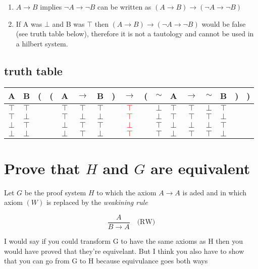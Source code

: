\documentclass{article}
\begin{document}
\begin{enumerate}
	\item $A \to B$ implies $\neg A \to \neg B$ can be written as 
		$(A \to B) \to (\neg A \to \neg B)$
	\item If A was $\bot$ and B was $\top$ then $(A \to B) \to (\neg A \to 
		\neg B)$ would be false (see truth table below), therefore it is not a tautology and cannot
		be used in a hilbert system.
\end{enumerate}
\subsection{truth table}
\begin{tabular}{@{ }c@{ }@{ }c | c@{}@{}c@{}@{ }c@{ }@{ }c@{ }@{ }c@{ }@{}c@{}@{ }c@{ }@{}c@{}@{ }c@{ }@{ }c@{ }@{ }c@{ }@{ }c@{ }@{ }c@{ }@{}c@{}@{}c@{ }}
A & B & ( & ( & A & $\rightarrow$ & B & ) & $\rightarrow$ & ( & $\sim$ & A & $\rightarrow$ & $\sim$ & B & ) & )\\
\hline 
$\top$ & $\top$ &  &  & $\top$ & $\top$ & $\top$ &  & \textcolor{red}{$\top$} &  & $\bot$ & $\top$ & $\top$ & $\bot$ & $\top$ &  & \\
$\top$ & $\bot$ &  &  & $\top$ & $\bot$ & $\bot$ &  & \textcolor{red}{$\top$} &  & $\bot$ & $\top$ & $\top$ & $\top$ & $\bot$ &  & \\
$\bot$ & $\top$ &  &  & $\bot$ & $\top$ & $\top$ &  & \textcolor{red}{$\bot$} &  & $\top$ & $\bot$ & $\bot$ & $\bot$ & $\top$ &  & \\
$\bot$ & $\bot$ &  &  & $\bot$ & $\top$ & $\bot$ &  & \textcolor{red}{$\top$} &  & $\top$ & $\bot$ & $\top$ & $\top$ & $\bot$ &  & \\
\end{tabular}

\section{Prove that $H$ and $G$ are equivalent}
Let $G$ be the proof system $H$ to which the axiom $A \to A$ 
is aded and in which axiom $(W)$ is replaced by the \emph{weakining rule}

\[\frac{A}{B \to A}\quad\text{(RW)} \]

I would say if you could transform G to have the same
axioms as H then you would have proved that they're equivelant. But I think
you also have to show that you can go from G to H because equivulance goes both
ways
\end{document}
